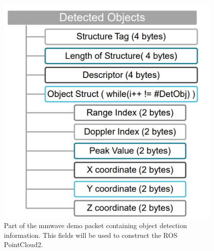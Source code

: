 \documentclass[12pt]{article}
\begin{document}
\begin{figure}[!htb]
    \centering
    \includegraphics[scale=0.5]{2_demo_vis_struct.PNG}
    \caption{Part of the mmwave demo packet containing object detection information. This fields will be used to construct the ROS PointCloud2.}
    \label{fig:my_label}
\end{figure}
\end{document}
